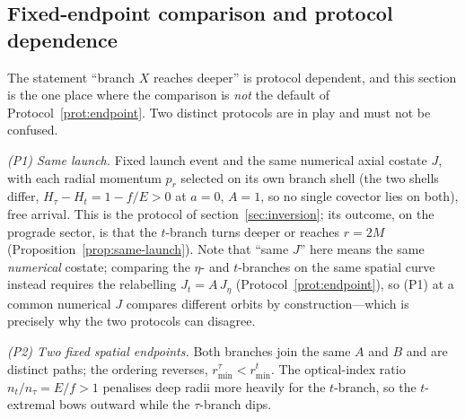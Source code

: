 \documentclass[12pt]{iopart}
\theoremstyle{plain}
\theoremstyle{definition}
\theoremstyle{remark}
\begin{document}
\subsection{Fixed-endpoint comparison and protocol dependence}
\label{sec:bvp}
The statement ``branch $X$ reaches deeper'' is protocol dependent, and this
section is the one place where the comparison is \emph{not} the default of
Protocol~\ref{prot:endpoint}. Two distinct protocols are in play and must not be
confused.

\emph{(P1) Same launch.} Fixed launch event and the same numerical axial costate $J$,
with each radial momentum $p_r$ selected on its own branch shell (the two shells differ,
$H_\tau-H_t=1-f/E>0$ at $a=0$, $A=1$, so no single covector lies on both), free arrival. This is the protocol of section~\ref{sec:inversion}; its outcome, on the
prograde sector, is that the $t$-branch turns deeper or reaches $r=2M$
(Proposition~\ref{prop:same-launch}). Note that ``same $J$'' here means the same
\emph{numerical} costate; comparing the $\eta$- and $t$-branches on the same
spatial curve instead requires the relabelling $J_t=A\,J_\eta$
(Protocol~\ref{prot:endpoint}), so (P1) at a common numerical $J$ compares
different orbits by construction---which is precisely why the two protocols can
disagree.

\emph{(P2) Two fixed spatial endpoints.} Both branches join the same $A$ and $B$
and are distinct paths; the ordering reverses, $r_{\min}^\tau<r_{\min}^t$. The
optical-index ratio $n_t/n_\tau=E/f>1$ penalises deep radii more heavily for the
$t$-branch, so the $t$-extremal bows outward while the $\tau$-branch dips.
\end{document}

